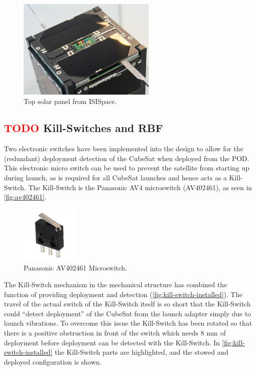 \begin{figure}[!ht]
    \begin{center}
        \includegraphics[width=0.6\textwidth]{figures/subsystems/isis-top-solar-panel}
        \caption{Top solar panel from ISISpace.}
        \label{fig:top-solar-panel}
    \end{center}
\end{figure}

\subsection{ \textcolor{red}{TODO} Kill-Switches and RBF}

Two electronic switches have been implemented into the design to allow for the (redundant) deployment detection of the CubeSat when deployed from the POD. This electronic micro switch can be used to prevent the satellite from starting up during launch, as is required for all CubeSat launches and hence acts as a Kill-Switch. The Kill-Switch is the Panasonic AV4 microswitch (AV402461), as seen in \autoref{fig:av402461}.

\begin{figure}[!ht]
    \begin{center}
        \includegraphics[width=0.25\textwidth]{figures/subsystems/av402461}
        \caption{Panasonic AV402461 Microswitch.}
        \label{fig:av402461}
    \end{center}
\end{figure}

The Kill-Switch mechanism in the mechanical structure has combined the function of providing deployment and detection (\autoref{fig:kill-switch-installed}). The travel of the actual switch of the Kill-Switch itself is so short that the Kill-Switch could ``detect deployment'' of the CubeSat from the launch adapter simply due to launch vibrations. To overcome this issue the Kill-Switch has been rotated so that there is a positive obstruction in front of the switch which needs 8 mm of deployment before deployment can be detected with the Kill-Switch. In \autoref{fig:kill-switch-installed} the Kill-Switch parts are highlighted, and the stowed and deployed configuration is shown.

